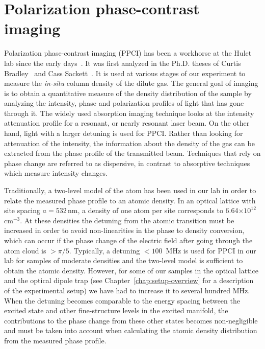  
\section{Polarization phase-contrast imaging} 

Polarization phase-contrast imaging (PPCI) has been a workhorse at the Hulet
lab since the early days~\cite{Bradley1997,Dries2010}.  It was first analyzed
in the Ph.D. theses of Curtis Bradley~\cite{Bradley1996} and Cass
Sackett~\cite{Sackett1998}. It is used at various stages of our experiment to
measure the \textit{in-situ} column density of the dilute gas.   The general
goal of imaging is to obtain a quantitative measure of the density distribution
of the sample by analyzing the intensity, phase and polarization profiles of
light that has gone through it.    The widely used absorption imaging technique
looks at the intensity attenuation profile for a resonant, or nearly resonant
laser beam.   On the other hand, light with a larger detuning is used for PPCI.
Rather than looking for attenuation of the intensity, the information about the
density of the gas can be extracted from the phase profile of the transmitted
beam.   Techniques that rely on phase change are referred to as dispersive, in
contrast to absorptive techniques which measure intensity changes. 

Traditionally, a two-level model of the atom has been used in our lab in order
to relate the measured phase profile to an atomic density.  In an optical
lattice with site spacing $a=532\,$nm, a density of one atom per site
corresponds to 6.64$\times10^{12}$\,cm$^{-3}$.  At these densities the detuning
from the atomic transition must be increased in order to avoid non-linearities
in the phase to density conversion,  which can occur if the phase change of the
electric field after going through the atom cloud is $>\pi/5$.   Typically, a
detuning $<100$~MHz is used for PPCI in our lab for samples of moderate
densities and the two-level model is sufficient to obtain the atomic density.
However, for some of our samples in the optical lattice and the optical dipole
trap (see Chapter~\ref{chap:setup-overview} for a description of the experimental
setup) we have had to increase it to several hundred MHz.  When the detuning
becomes comparable to the energy spacing between the excited state and other
fine-structure levels in the excited manifold, the contributions to the phase
change from these other states becomes non-negligible and must be taken into
account when calculating the atomic density distribution from the measured
phase profile. 

